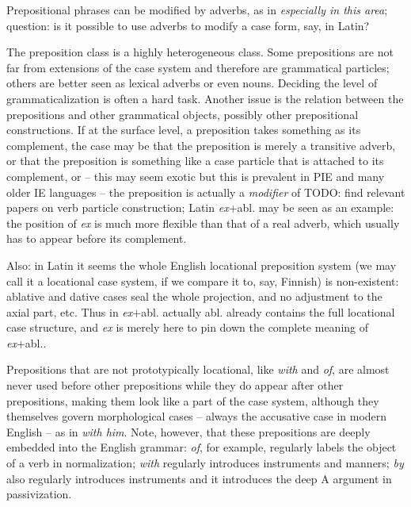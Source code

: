\documentclass[UTF8, a4paper, oneside, scheme=plain, 12pt]{ctexbook}
\newcommand{\form}[1]{\emph{#1}}
\begin{document}
Prepositional phrases can be modified by adverbs,
as in \form{especially in this area};
question: is it possible to use adverbs to modify a case form, say, in Latin?

The preposition class is a highly heterogeneous class.
Some prepositions are not far from extensions of the case system 
and therefore are grammatical particles;
others are better seen as lexical adverbs or even nouns.
Deciding the level of grammaticalization is often a hard task.
Another issue is the relation between the prepositions 
and other grammatical objects, possibly other prepositional constructions.
If at the surface level, a preposition takes something as its complement, 
the case may be that the preposition is merely a transitive adverb,
or that the preposition is something like a case particle that is attached to its complement, 
or -- this may seem exotic but this is prevalent in PIE and many older IE languages --
the preposition is actually a \emph{modifier} of TODO: find relevant papers on verb particle construction;
Latin \form{ex}+abl. may be seen as an example: 
the position of \form{ex} is much more flexible than 
that of a real adverb, which usually has to appear before its complement.

Also: in Latin it seems the whole English locational preposition system 
(we may call it a locational case system, if we compare it to, say, Finnish)
is non-existent: ablative and dative cases seal the whole projection, 
and no adjustment to the axial part, etc.
Thus in \form{ex}+abl. actually abl. already contains the full locational case structure,
and \form{ex} is merely here to pin down the complete meaning of \form{ex}+abl..

Prepositions that are not prototypically locational, 
like \form{with} and \form{of}, are almost never used 
before other prepositions 
while they do appear after other prepositions,
making them look like a part of the case system, 
although they themselves govern morphological cases -- 
always the accusative case in modern English --
as in \form{with him}.
Note, however, that these prepositions are deeply embedded into the English grammar:
\form{of}, for example, regularly labels the object 
of a verb in normalization;
\form{with} regularly introduces instruments and manners; 
\form{by} also regularly introduces instruments 
and it introduces the deep A argument in passivization.
\end{document}
